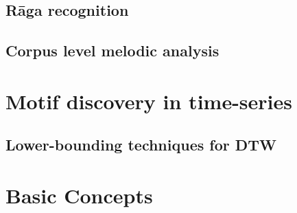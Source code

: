 \subsection{R\={a}ga recognition}
\subsection{Corpus level melodic analysis}

\section{Motif discovery in time-series}
\subsection{Lower-bounding techniques for DTW}

\section{{Basic Concepts}}